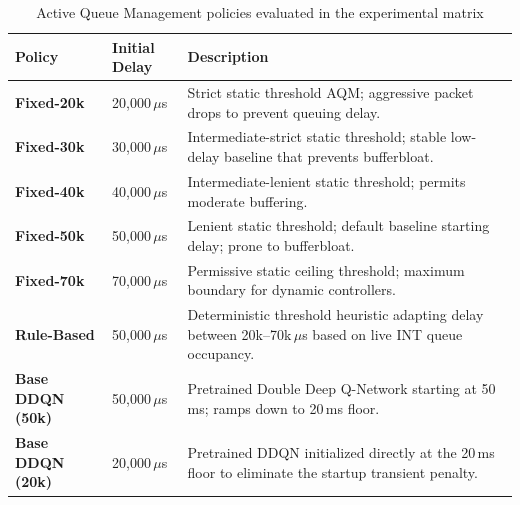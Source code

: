 \documentclass[12pt,a4paper,oneside]{report}
\begin{document}
\begin{table}[H]
\centering
\caption{Active Queue Management policies evaluated in the experimental matrix}
\label{tab:eval_policies}
\begin{tabularx}{\textwidth}{p{}p{}X}
\toprule
\textbf{Policy} & \textbf{Initial Delay} & \textbf{Description} \\
\midrule
\textbf{Fixed-20k} & 20,000\,$\mu$s & Strict static threshold AQM; aggressive packet drops to prevent queuing delay. \\
\textbf{Fixed-30k} & 30,000\,$\mu$s & Intermediate-strict static threshold; stable low-delay baseline that prevents bufferbloat. \\
\textbf{Fixed-40k} & 40,000\,$\mu$s & Intermediate-lenient static threshold; permits moderate buffering. \\
\textbf{Fixed-50k} & 50,000\,$\mu$s & Lenient static threshold; default baseline starting delay; prone to bufferbloat. \\
\textbf{Fixed-70k} & 70,000\,$\mu$s & Permissive static ceiling threshold; maximum boundary for dynamic controllers. \\
\midrule
\textbf{Rule-Based} & 50,000\,$\mu$s & Deterministic threshold heuristic adapting delay between 20k--70k\,$\mu$s based on live INT queue occupancy. \\
\textbf{Base DDQN (50k)} & 50,000\,$\mu$s & Pretrained Double Deep Q-Network starting at 50\,ms; ramps down to 20\,ms floor. \\
\textbf{Base DDQN (20k)} & 20,000\,$\mu$s & Pretrained DDQN initialized directly at the 20\,ms floor to eliminate the startup transient penalty. \\
\bottomrule
\end{tabularx}
\end{table}
\end{document}
